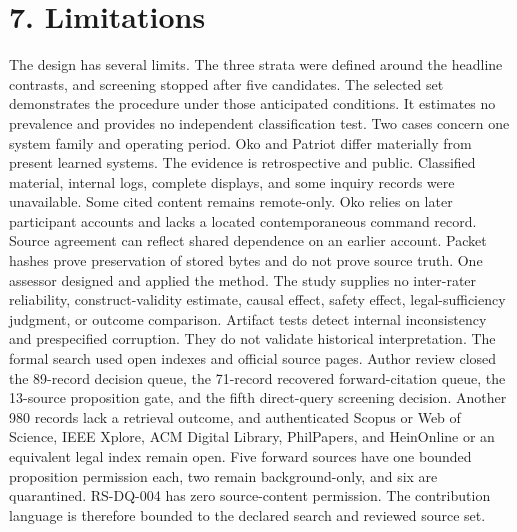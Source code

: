 \documentclass[11pt]{article}
\begin{document}
\section*{7. Limitations}
The design has several limits. The three strata were defined around the headline contrasts, and screening stopped after five candidates. The selected set demonstrates the procedure under those anticipated conditions. It estimates no prevalence and provides no independent classification test. Two cases concern one system family and operating period. Oko and Patriot differ materially from present learned systems.
The evidence is retrospective and public. Classified material, internal logs, complete displays, and some inquiry records were unavailable. Some cited content remains remote-only. Oko relies on later participant accounts and lacks a located contemporaneous command record. Source agreement can reflect shared dependence on an earlier account. Packet hashes prove preservation of stored bytes and do not prove source truth.
One assessor designed and applied the method. The study supplies no inter-rater reliability, construct-validity estimate, causal effect, safety effect, legal-sufficiency judgment, or outcome comparison. Artifact tests detect internal inconsistency and prespecified corruption. They do not validate historical interpretation.
The formal search used open indexes and official source pages. Author review closed the 89-record decision queue, the 71-record recovered forward-citation queue, the 13-source proposition gate, and the fifth direct-query screening decision. Another 980 records lack a retrieval outcome, and authenticated Scopus or Web of Science, IEEE Xplore, ACM Digital Library, PhilPapers, and HeinOnline or an equivalent legal index remain open. Five forward sources have one bounded proposition permission each, two remain background-only, and six are quarantined. RS-DQ-004 has zero source-content permission. The contribution language is therefore bounded to the declared search and reviewed source set.
\FloatBarrier
\end{document}
